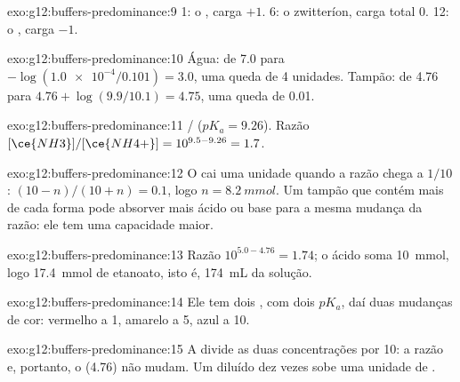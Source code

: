 \begin{solution}{exo:g12:buffers-predominance:9}
 1: o  , carga $+1$.  6: o zwitteríon, carga
total 0.  12: o  , carga $-1$.
\end{solution}

\begin{solution}{exo:g12:buffers-predominance:10}
Água: de 7.0 para $-\log(\num{1.0e-4}/0.101) = 3.0$, uma queda de 4
unidades. Tampão: de 4.76 para $4.76 + \log(9.9/10.1) = 4.75$, uma queda
de 0.01.
\end{solution}

\begin{solution}{exo:g12:buffers-predominance:11}
/ ($pK_a = 9.26$). Razão
$[\ce{NH3}]/[\ce{NH4+}] = 10^{9.5 - 9.26} = 1.7$.
\end{solution}

\begin{solution}{exo:g12:buffers-predominance:12}
O  cai uma unidade quando a razão chega a $1/10$:
$(10 - n)/(10 + n) = 0.1$, logo $n = \qty{8.2}{mmol}$. Um tampão que
contém mais de cada forma pode absorver mais ácido ou base para a mesma
mudança da razão: ele tem uma capacidade maior.
\end{solution}

\begin{solution}{exo:g12:buffers-predominance:13}
Razão $10^{5.0 - 4.76} = 1.74$; o ácido soma \qty{10}{mmol}, logo
\qty{17.4}{mmol} de etanoato, isto é, \qty{174}{mL} da solução.
\end{solution}

\begin{solution}{exo:g12:buffers-predominance:14}
Ele tem dois , com dois $pK_a$, daí duas mudanças de
cor: vermelho a  1, amarelo a  5, azul a  10.
\end{solution}

\begin{solution}{exo:g12:buffers-predominance:15}
A  divide as duas concentrações por 10: a razão e, portanto, o
 (4.76) não mudam. Um  diluído dez vezes sobe uma unidade
de .
\end{solution}

